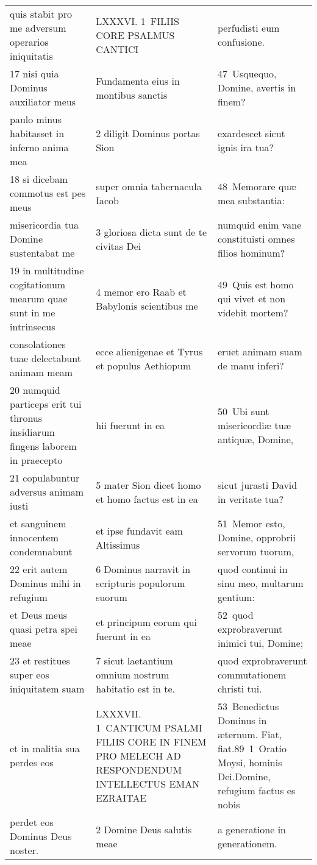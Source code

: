 \documentclass{article}
\begin{document}
\begin{longtable}{@{}p{}p{}p{}@{}}
quis stabit pro me adversum operarios iniquitatis	&	LXXXVI. 1 FILIIS CORE PSALMUS CANTICI	&	perfudisti eum confusione.	\\
17 nisi quia Dominus auxiliator meus	&	Fundamenta eius in montibus sanctis	&	47 Usquequo, Domine, avertis in finem?	\\
paulo minus habitasset in inferno anima mea	&	2 diligit Dominus portas Sion	&	exardescet sicut ignis ira tua?	\\
18 si dicebam commotus est pes meus	&	super omnia tabernacula Iacob	&	48 Memorare quæ mea substantia:	\\
misericordia tua Domine sustentabat me	&	3 gloriosa dicta sunt de te civitas Dei	&	numquid enim vane constituisti omnes filios hominum?	\\
19 in multitudine cogitationum mearum quae sunt in me intrinsecus	&	4 memor ero Raab et Babylonis scientibus me	&	49 Quis est homo qui vivet et non videbit mortem?	\\
consolationes tuae delectabunt animam meam	&	ecce alienigenae et Tyrus et populus Aethiopum	&	eruet animam suam de manu inferi?	\\
20 numquid particeps erit tui thronus insidiarum fingens laborem in praecepto	&	hii fuerunt in ea	&	50 Ubi sunt misericordiæ tuæ antiquæ, Domine,	\\
21 copulabuntur adversus animam iusti	&	5 mater Sion dicet homo et homo factus est in ea	&	sicut jurasti David in veritate tua?	\\
et sanguinem innocentem condemnabunt	&	et ipse fundavit eam Altissimus	&	51 Memor esto, Domine, opprobrii servorum tuorum,	\\
22 erit autem Dominus mihi in refugium	&	6 Dominus narravit in scripturis populorum suorum	&	quod continui in sinu meo, multarum gentium:	\\
et Deus meus quasi petra spei meae	&	et principum eorum qui fuerunt in ea	&	52 quod exprobraverunt inimici tui, Domine;	\\
23 et restitues super eos iniquitatem suam	&	7 sicut laetantium omnium nostrum habitatio est in te.	&	quod exprobraverunt commutationem christi tui.	\\
et in malitia sua perdes eos	&	LXXXVII. 1 CANTICUM PSALMI FILIIS CORE IN FINEM PRO MELECH AD RESPONDENDUM INTELLECTUS EMAN EZRAITAE	&	53 Benedictus Dominus in æternum. Fiat, fiat.89 1 Oratio Moysi, hominis Dei.Domine, refugium factus es nobis	\\
perdet eos Dominus Deus noster.	&	2 Domine Deus salutis meae	&	a generatione in generationem.	\\

\end{longtable}
\end{document}
